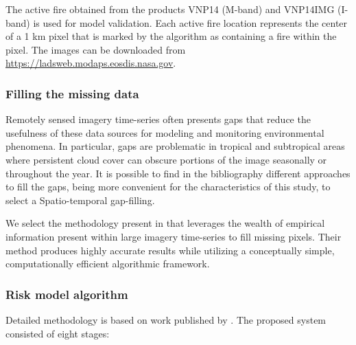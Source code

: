 \documentclass{article}
\begin{document}
The active fire obtained from the products VNP14 (M-band) and VNP14IMG (I-band) is used for model validation. Each active fire location represents the center of a 1 km pixel that is marked by the algorithm as containing a fire within the pixel. The images can be downloaded from 
\url{https://ladsweb.modaps.eosdis.nasa.gov}.


\subsubsection{Filling the missing data}

Remotely sensed imagery time-series often presents gaps that reduce the usefulness of these data sources for modeling and monitoring environmental phenomena. In particular, gaps are problematic  in tropical and subtropical areas where persistent cloud cover can obscure portions of the image seasonally or throughout the year. It is possible to find in the bibliography different approaches to fill the gaps, being more convenient for the characteristics of this study, to select a Spatio-temporal gap-filling.

We select the methodology present in \cite{weiss2014effective}  that leverages the wealth of empirical information present within large imagery time-series to fill missing pixels. Their method produces highly accurate results while utilizing a conceptually simple, computationally efficient algorithmic framework. 

\subsubsection{Risk model algorithm}

Detailed methodology is based on work published by \cite{chowdhury2013use}. The proposed system consisted of eight stages:
\end{document}
